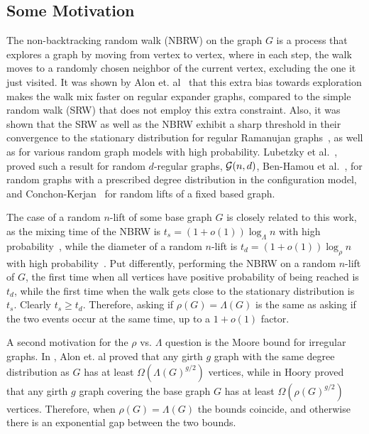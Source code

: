 \documentclass{article}
\begin{document}
\subsection{Some Motivation}
    The non-backtracking random walk (NBRW) on the graph $G$ is a process that explores a graph by moving from vertex to vertex, 
    where in 
    each step, the walk moves to a randomly chosen neighbor of the current vertex, excluding the one it just visited. 
    It was shown by Alon et. al~\cite{alon2007non} that this extra bias towards exploration makes the walk mix faster on regular expander graphs, compared to the simple random walk (SRW) that does not employ this extra constraint. 
    Also, it was shown that the SRW as well as the NBRW exhibit a sharp threshold in their convergence to the stationary distribution for regular Ramanujan graphs~\cite{lubetzky2016cutoff}, as well as for various random graph models with high probability.
    Lubetzky et al.~\cite{lubetzky2010cutoff}, proved such a result for random $d$-regular graphs, ${\cal G}(n,d)$,
    Ben-Hamou et al.~\cite{ben2017cutoff}, for random graphs with a prescribed degree distribution in the configuration model,
    and Conchon-Kerjan~\cite{conchon2022cutoff}  for random lifts of a fixed based graph.

    The case of a random $n$-lift of some base graph $G$ is closely related to this work, as the mixing time of the NBRW is $t_s = (1+o(1)) \log_{\Lambda}n$ with high probability~\cite{conchon2022cutoff}, while the diameter of a random $n$-lift is $t_d = (1+o(1)) \log_{\rho}n$ with high probability~\cite{conchon2021sparse}. 
    Put differently, performing the NBRW on a random $n$-lift of $G$, the first time when all vertices have positive probability of being reached is $t_d$, 
    while the first time when the walk gets close to the stationary distribution is $t_s$.
    Clearly $t_s \geq t_d$.
    Therefore, asking if $\rho(G) = \Lambda(G)$ is the same as asking if the two events occur at the same time, up to a $1+o(1)$ factor. 

    A second motivation for the $\rho$ vs. $\Lambda$ question is the Moore bound for irregular graphs.
    In \cite{alon2002moore}, Alon et. al proved that any girth $g$ graph 
    with the same degree distribution as $G$ has at least $\Omega(\Lambda(G)^{g/2})$ vertices,
    while in \cite{hoory2024girth} Hoory proved that any girth $g$ graph covering the base graph $G$ has at least $\Omega(\rho(G)^{g/2})$ vertices.
    Therefore, when $\rho(G) = \Lambda(G)$ the bounds coincide, and otherwise there is an exponential gap between the two bounds.
\end{document}

